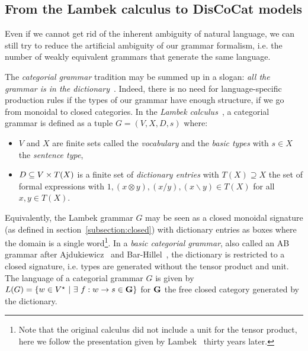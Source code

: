 
\subsection{From the Lambek calculus to DisCoCat models}\label{subsection:lambek-discocat}

Even if we cannot get rid of the inherent ambiguity of natural language, we can still try to reduce the artificial ambiguity of our grammar formalism, i.e. the number of weakly equivalent grammars that generate the same language.

The \emph{categorial grammar} tradition may be summed up in a slogan: \emph{all the grammar is in the dictionary}~\cite{Preller07}.
Indeed, there is no need for language-specific production rules if the types of our grammar have enough structure, if we go from monoidal to closed categories.
In the \emph{Lambek calculus}~\cite{Lambek58}, a categorial grammar is defined as a tuple $G = (V, X, D, s)$ where:
\begin{itemize}
\item $V$ and $X$ are finite sets called the \emph{vocabulary} and the \emph{basic types} with $s \in X$ the \emph{sentence type},
\item $D \subseteq V \times T(X)$ is a finite set of \emph{dictionary entries} with $T(X) \supseteq X$ the set of formal expressions with $1, (x \otimes y), (x / y), (x \backslash y) \in T(X)$ for all $x, y \in T(X)$.
\end{itemize}
Equivalently, the Lambek grammar $G$ may be seen as a closed monoidal signature (as defined in section~\ref{subsection:closed}) with dictionary entries as boxes where the domain is a single word\footnote
{Note that the original calculus did not include a unit for the tensor product, here we follow the presentation given by Lambek~\cite{Lambek88} thirty years later.}.
In a \emph{basic categorial grammar}, also called an AB grammar after Ajdukiewicz~\cite{Ajdukiewicz35} and Bar-Hillel~\cite{Bar-Hillel54}, the dictionary is restricted to a closed signature, i.e. types are generated without the tensor product and unit.
The language of a categorial grammar $G$ is given by $L(G) = \{ w \in V^\star \ \vert \ \exists \ f : w \to s \in \G \}$ for $\mathbf{G}$ the free closed category generated by the dictionary.


